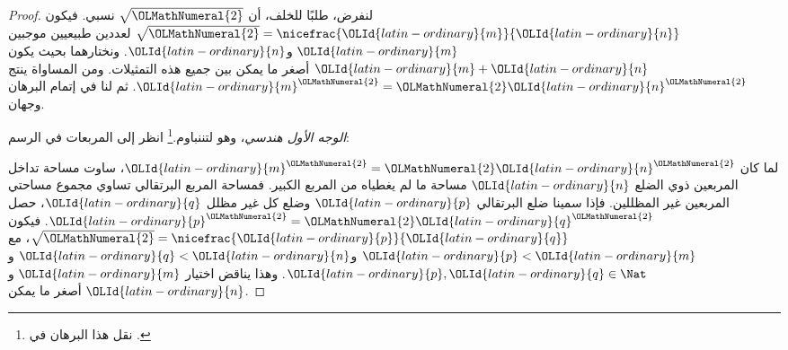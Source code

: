\documentclass[../../../include/open-logic-section]{subfiles}
\begin{document}
\begin{proof}
لنفرض، طلبًا للخلف، أن $\sqrt{\OLMathNumeral{2}}$ نسبي. فيكون $\sqrt{\OLMathNumeral{2}} =
\nicefrac{\OLId{latin-ordinary}{m}}{\OLId{latin-ordinary}{n}}$ لعددين طبيعيين موجبين $\OLId{latin-ordinary}{m}$ و$\OLId{latin-ordinary}{n}$. ونختارهما بحيث يكون
$\OLId{latin-ordinary}{m}+\OLId{latin-ordinary}{n}$ أصغر ما يمكن بين جميع هذه التمثيلات. ومن المساواة ينتج
$\OLId{latin-ordinary}{m}^{\OLMathNumeral{2}} = \OLMathNumeral{2}\OLId{latin-ordinary}{n}^{\OLMathNumeral{2}}$. ثم لنا في إتمام البرهان وجهان.

\emph{الوجه الأول هندسي}، وهو لتننباوم.\footnote{نقل هذا البرهان في \cite{Conway2006}.} انظر إلى المربعات في الرسم:
\begin{center}
\end{center}
لما كان $\OLId{latin-ordinary}{m}^\OLMathNumeral{2} = \OLMathNumeral{2}\OLId{latin-ordinary}{n}^\OLMathNumeral{2}$، ساوت مساحة تداخل المربعين ذوي الضلع $\OLId{latin-ordinary}{n}$ مساحة ما لم يغطياه من المربع الكبير. فمساحة المربع البرتقالي تساوي مجموع مساحتي المربعين غير المظللين. فإذا سمينا ضلع البرتقالي $\OLId{latin-ordinary}{p}$ وضلع كل غير مظلل $\OLId{latin-ordinary}{q}$، حصل $\OLId{latin-ordinary}{p}^\OLMathNumeral{2} = \OLMathNumeral{2}\OLId{latin-ordinary}{q}^\OLMathNumeral{2}$. فيكون $\sqrt{\OLMathNumeral{2}} = \nicefrac{\OLId{latin-ordinary}{p}}{\OLId{latin-ordinary}{q}}$، مع $\OLId{latin-ordinary}{p} < \OLId{latin-ordinary}{m}$ و$\OLId{latin-ordinary}{q} < \OLId{latin-ordinary}{n}$ و$\OLId{latin-ordinary}{p}, \OLId{latin-ordinary}{q} \in
\Nat$. وهذا يناقض اختيار $\OLId{latin-ordinary}{m}$ و$\OLId{latin-ordinary}{n}$ أصغر ما يمكن.


\end{proof}
\end{document}
